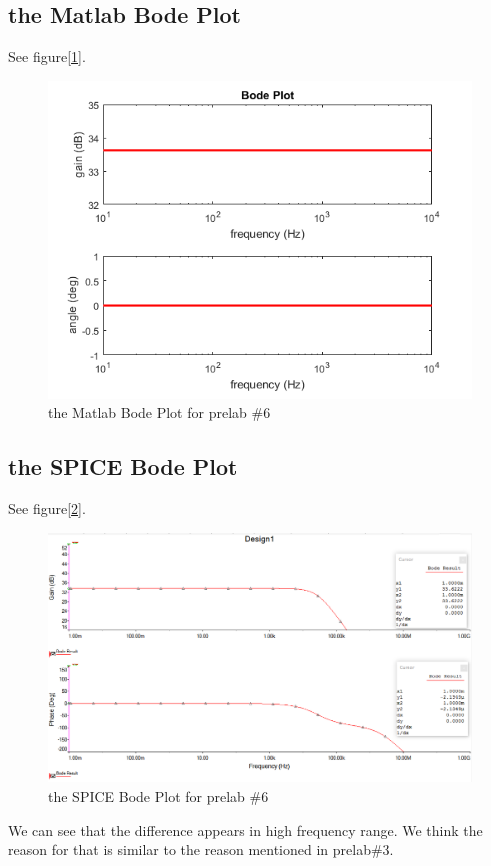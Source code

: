 \documentclass{IEEEtran}
\begin{document}
	\subsection{the Matlab Bode Plot}
	See figure[\ref{fig:601}].
	\begin{figure}[!htbp]
		\centering
		\begin{framed}
			\includegraphics[width=\linewidth]{images/6.png}
			\caption{the Matlab Bode Plot for prelab \#6}
			\label{fig:601}
		\end{framed}
	\end{figure}

	\subsection{the SPICE Bode Plot}
	See figure[\ref{fig:602}].
	\begin{figure}[!htbp]
		\centering
		\begin{framed}
			\includegraphics[width=\linewidth]{images/6_2.PNG}
			\caption{the SPICE Bode Plot for prelab \#6}
			\label{fig:602}
		\end{framed}
	\end{figure}
	\phantom{ } We can see that the difference appears in high frequency range. We think the reason for that is similar to the reason mentioned in prelab\#3.
\end{document}
